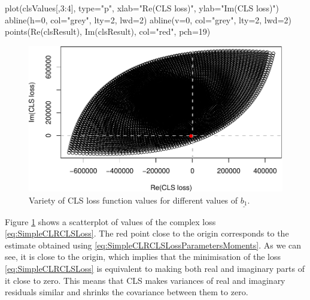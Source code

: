 \documentclass[
]{book}
\newenvironment{Shaded}{\begin{snugshade}}{\end{snugshade}}
\newcommand{\AttributeTok}[1]{\textcolor[rgb]{0.77,0.63,0.00}{#1}}
\newcommand{\DecValTok}[1]{\textcolor[rgb]{0.00,0.00,0.81}{#1}}
\newcommand{\FunctionTok}[1]{\textcolor[rgb]{0.00,0.00,0.00}{#1}}
\newcommand{\NormalTok}[1]{#1}
\newcommand{\SpecialCharTok}[1]{\textcolor[rgb]{0.00,0.00,0.00}{#1}}
\newcommand{\StringTok}[1]{\textcolor[rgb]{0.31,0.60,0.02}{#1}}
\begin{document}
\begin{Shaded}
\begin{Highlighting}[]
\FunctionTok{plot}\NormalTok{(clsValues[,}\DecValTok{3}\SpecialCharTok{:}\DecValTok{4}\NormalTok{], }\AttributeTok{type=}\StringTok{"p"}\NormalTok{,}
     \AttributeTok{xlab=}\StringTok{"Re(CLS loss)"}\NormalTok{, }\AttributeTok{ylab=}\StringTok{"Im(CLS loss)"}\NormalTok{)}
\FunctionTok{abline}\NormalTok{(}\AttributeTok{h=}\DecValTok{0}\NormalTok{, }\AttributeTok{col=}\StringTok{"grey"}\NormalTok{, }\AttributeTok{lty=}\DecValTok{2}\NormalTok{, }\AttributeTok{lwd=}\DecValTok{2}\NormalTok{)}
\FunctionTok{abline}\NormalTok{(}\AttributeTok{v=}\DecValTok{0}\NormalTok{, }\AttributeTok{col=}\StringTok{"grey"}\NormalTok{, }\AttributeTok{lty=}\DecValTok{2}\NormalTok{, }\AttributeTok{lwd=}\DecValTok{2}\NormalTok{)}
\FunctionTok{points}\NormalTok{(}\FunctionTok{Re}\NormalTok{(clsResult), }\FunctionTok{Im}\NormalTok{(clsResult), }\AttributeTok{col=}\StringTok{"red"}\NormalTok{, }\AttributeTok{pch=}\DecValTok{19}\NormalTok{)}
\end{Highlighting}
\end{Shaded}

\begin{figure}
\centering
\includegraphics{Svetunkov---Svetunkov---Complex-Dynamic-Models_files/figure-latex/clsScatter-1.pdf}
\caption{\label{fig:clsScatter}Variety of CLS loss function values for different values of \(\underline{b_1}\).}
\end{figure}

Figure \ref{fig:clsScatter} shows a scatterplot of values of the complex loss \eqref{eq:SimpleCLRCLSLoss}. The red point close to the origin corresponds to the estimate obtained using \eqref{eq:SimpleCLRCLSLossParametersMoments}. As we can see, it is close to the origin, which implies that the minimisation of the loss \eqref{eq:SimpleCLRCLSLoss} is equivalent to making both real and imaginary parts of it close to zero. This means that CLS makes variances of real and imaginary residuals similar and shrinks the covariance between them to zero.
\end{document}
